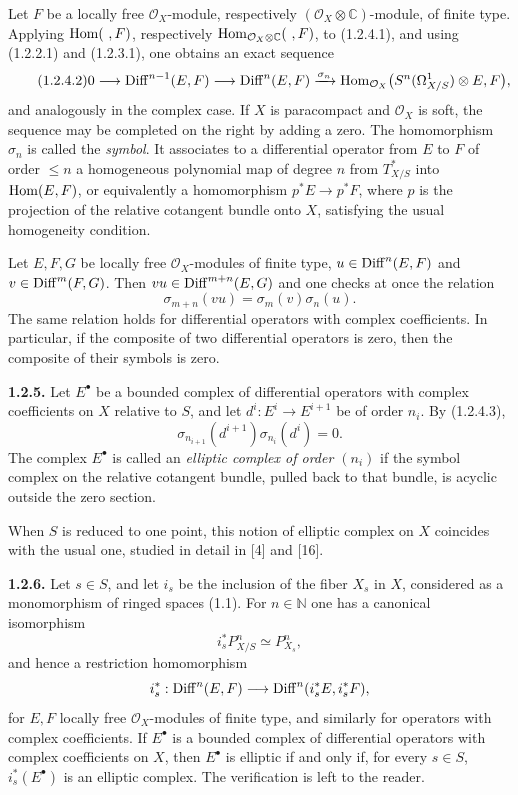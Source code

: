 \documentclass[11pt]{article}
\begin{document}
Let $F$ be a locally free $\mathcal O_X$-module, respectively $(\mathcal O_X\otimes\mathbb C)$-module, of finite type. Applying $\operatorname{Hom}(\ ,F)$, respectively $\operatorname{Hom}_{\mathcal O_X\otimes\mathbb C}(\ ,F)$, to (1.2.4.1), and using (1.2.2.1) and (1.2.3.1), one obtains an exact sequence
\begin{equation}\tag{1.2.4.2}
0\longrightarrow \operatorname{Diff}^{n-1}(E,F)\longrightarrow \operatorname{Diff}^n(E,F)
\xrightarrow{\sigma_n}
\operatorname{Hom}_{\mathcal O_X}\bigl(S^n(\Omega^1_{X/S})\otimes E,F\bigr),
\end{equation}
and analogously in the complex case. If $X$ is paracompact and $\mathcal O_X$ is soft, the sequence may be completed on the right by adding a zero. The homomorphism $\sigma_n$ is called the \emph{symbol}. It associates to a differential operator from $E$ to $F$ of order $\le n$ a homogeneous polynomial map of degree $n$ from $T^*_{X/S}$ into $\operatorname{Hom}(E,F)$, or equivalently a homomorphism $p^*E\to p^*F$, where $p$ is the projection of the relative cotangent bundle onto $X$, satisfying the usual homogeneity condition.

Let $E,F,G$ be locally free $\mathcal O_X$-modules of finite type, $u\in\operatorname{Diff}^n(E,F)$ and $v\in\operatorname{Diff}^m(F,G)$. Then $vu\in\operatorname{Diff}^{m+n}(E,G)$ and one checks at once the relation
\begin{equation}\tag{1.2.4.3}
 \sigma_{m+n}(vu)=\sigma_m(v)\sigma_n(u).
\end{equation}
The same relation holds for differential operators with complex coefficients. In particular, if the composite of two differential operators is zero, then the composite of their symbols is zero.

\textbf{1.2.5.} Let $E^\bullet$ be a bounded complex of differential operators with complex coefficients on $X$ relative to $S$, and let $d^i:E^i\to E^{i+1}$ be of order $n_i$. By (1.2.4.3),
\[
 \sigma_{n_{i+1}}(d^{i+1})\sigma_{n_i}(d^i)=0.
\]
The complex $E^\bullet$ is called an \emph{elliptic complex of order $(n_i)$} if the symbol complex on the relative cotangent bundle, pulled back to that bundle, is acyclic outside the zero section.

When $S$ is reduced to one point, this notion of elliptic complex on $X$ coincides with the usual one, studied in detail in [4] and [16].

\textbf{1.2.6.} Let $s\in S$, and let $i_s$ be the inclusion of the fiber $X_s$ in $X$, considered as a monomorphism of ringed spaces (1.1). For $n\in\mathbb N$ one has a canonical isomorphism
\[
 i_s^*P^n_{X/S}\simeq P^n_{X_s},
\]
and hence a restriction homomorphism
\[
 i_s^*:\operatorname{Diff}^n(E,F)\longrightarrow \operatorname{Diff}^n(i_s^*E,i_s^*F),
\]
for $E,F$ locally free $\mathcal O_X$-modules of finite type, and similarly for operators with complex coefficients. If $E^\bullet$ is a bounded complex of differential operators with complex coefficients on $X$, then $E^\bullet$ is elliptic if and only if, for every $s\in S$, $i_s^*(E^\bullet)$ is an elliptic complex. The verification is left to the reader.
\end{document}
